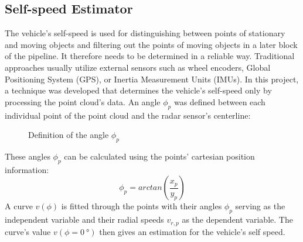 \subsection{Self-speed Estimator}
\label{sec:self-speed_estimator}
The vehicle's self-speed is used for distinguishing between points of stationary and moving objects and filtering out the points of moving objects in a later block of the pipeline.
It therefore needs to be determined in a reliable way.
Traditional approaches usually utilize external sensors such as wheel encoders, Global Positioning System (GPS), or Inertia Measurement Units (IMUs).
In this project, a technique was developed that determines the vehicle's self-speed only by processing the point cloud's data.
An angle $\phi_{p}$ was defined between each individual point of the point cloud and the radar sensor's centerline:
\par
\begin{figure}[!htbp]
    \centering
    \caption{Definition of the angle $\phi_{p}$}
    \label{fig:def_angle_phi}
\end{figure}
\FloatBarrier\noindent
These angles $\phi_{p}$ can be calculated using the points' cartesian position information:
\begin{equation*}
    \phi_{p} = arctan\left(\frac{x_{p}}{y_{p}}\right)
    \label{eq:calc_angle_phi}
\end{equation*}
A curve $v(\phi)$ is fitted through the points with their angles $\phi_{p}$ serving as the independent variable and their radial speeds $v_{r,p}$ as the dependent variable.
The curve's value $v(\phi = \SI{0}{\degree})$ then gives an estimation for the vehicle's self speed.
